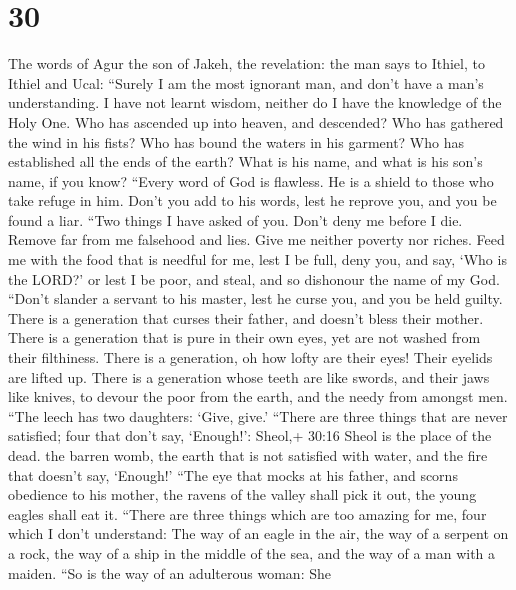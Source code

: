 \hypertarget{section-24}{%
\section{30}\label{section-24}}

 The words of Agur the son of Jakeh, the revelation: the man
says to Ithiel, to Ithiel and Ucal:  ``Surely I am the most
ignorant man, and don't have a man's understanding.  I have
not learnt wisdom, neither do I have the knowledge of the Holy One.
 Who has ascended up into heaven, and descended? Who has
gathered the wind in his fists? Who has bound the waters in his garment?
Who has established all the ends of the earth? What is his name, and
what is his son's name, if you know?  ``Every word of God is
flawless. He is a shield to those who take refuge in him. 
Don't you add to his words, lest he reprove you, and you be found a
liar.  ``Two things I have asked of you. Don't deny me
before I die.  Remove far from me falsehood and lies. Give
me neither poverty nor riches. Feed me with the food that is needful for
me,  lest I be full, deny you, and say, `Who is the LORD?'
or lest I be poor, and steal, and so dishonour the name of my God.
 ``Don't slander a servant to his master, lest he curse
you, and you be held guilty.  There is a generation that
curses their father, and doesn't bless their mother.  There
is a generation that is pure in their own eyes, yet are not washed from
their filthiness.  There is a generation, oh how lofty are
their eyes! Their eyelids are lifted up.  There is a
generation whose teeth are like swords, and their jaws like knives, to
devour the poor from the earth, and the needy from amongst men.
 ``The leech has two daughters: `Give, give.' ``There are
three things that are never satisfied; four that don't say, `Enough!':
 Sheol,+ 30:16 Sheol is the place of the dead. the barren
womb, the earth that is not satisfied with water, and the fire that
doesn't say, `Enough!'  ``The eye that mocks at his father,
and scorns obedience to his mother, the ravens of the valley shall pick
it out, the young eagles shall eat it.  ``There are three
things which are too amazing for me, four which I don't understand:
 The way of an eagle in the air, the way of a serpent on a
rock, the way of a ship in the middle of the sea, and the way of a man
with a maiden.  ``So is the way of an adulterous woman: She
